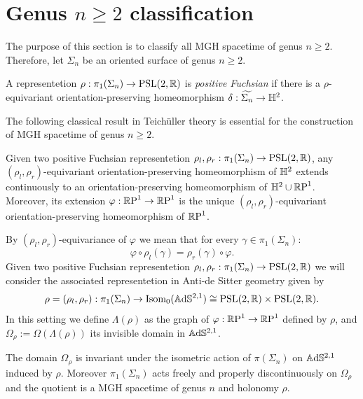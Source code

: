 \section{Genus $n\geq 2$ classification}
The purpose of this section is to classify all MGH spacetime of genus $n\geq 2$. Therefore, let $\Sigma_n$ be an oriented surface of genus $n\geq 2$.
\begin{definition}
    A representetion $\rho: \pi_1(\Sigma_n) \to \PSL$ is \textit{positive Fuchsian} if there is a $\rho$-equivariant orientation-preserving homeomorphism $\delta : \widetilde{\Sigma_n}\to\H^2$.
\end{definition}
The following classical result in Teich\"uller theory is essential for the construction of MGH spacetime of genus $n\geq 2$.
\begin{lemma}
    Given two positive Fuchsian representetion $\rho_l, \rho_r : \pi_1(\Sigma_n) \to \PSL$, any $(\rho_l, \rho_r)$-equivariant orientation-preserving homeomorphism of $\H^2$ extends continuously to an orientation-preserving homeomorphism of $\H^2\cup\S$. Moreover, its extension $\varphi : \S\to\S$ is the unique $(\rho_l, \rho_r)$-equivariant orientation-preserving homeomorphism of $\S$.
\end{lemma}
By $(\rho_l, \rho_r)$-equivariance of $\varphi$ we mean that for every $\gamma \in \pi_1(\Sigma_n)$:
\begin{equation} \label{eq:equivariance}
    \varphi \circ \rho_l(\gamma) = \rho_r(\gamma)\circ\varphi.
\end{equation}
Given two positive Fuchsian representetion $\rho_l, \rho_r : \pi_1(\Sigma_n) \to \PSL$ we will consider the associated representetion in Anti-de Sitter geometry given by
\[
    \rho = (\rho_l, \rho_r) : \pi_1(\Sigma_n) \to \text{Isom}_0(\A^{2,1}) \cong \PSL \times \PSL.
\]
In this setting we define $\Lambda(\rho)$ as the graph of $\varphi: \S\to\S$ defined by $\rho$, and $\Omega_\rho := \Omega(\Lambda(\rho))$ its invisible domain in $\A^{2,1}$.
\begin{proposition} \label{prop:MGH_example}
    The domain $\Omega_\rho$ is invariant under the isometric action of $\pi(\Sigma_n)$ on $\A^{2,1}$ induced by $\rho$. Moreover $\pi_1(\Sigma_n)$ acts freely and properly discontinuously on $\Omega_\rho$ and the quotient is a MGH spacetime of genus $n$ and holonomy $\rho$.
\end{proposition}
